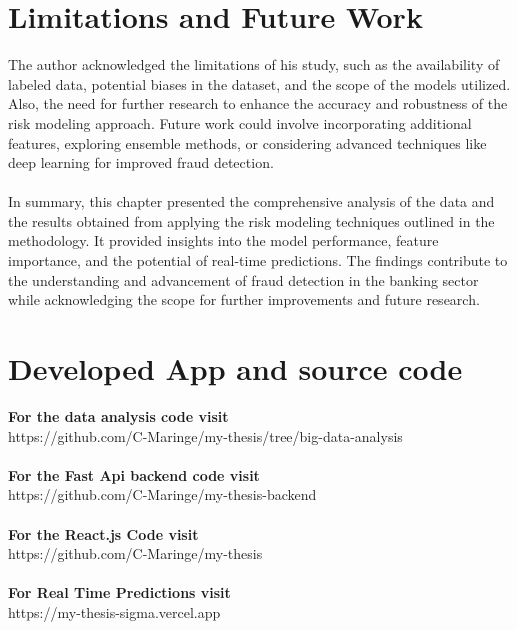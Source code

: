 \section{Limitations and Future Work}
The author acknowledged the limitations of his study, such as the availability of labeled data, potential biases in the 
dataset, and the scope of the models utilized. Also, the need for further research to enhance the accuracy 
and robustness of the risk modeling approach. Future work could involve incorporating additional features, 
exploring ensemble methods, or considering advanced techniques like deep learning for improved fraud detection.\\\\
In summary, this chapter presented the comprehensive analysis of the data and the results obtained from applying the 
risk modeling techniques outlined in the methodology. It provided insights into the model performance, feature 
importance, and the potential of real-time predictions. The findings contribute to the understanding and advancement 
of fraud detection in the banking sector while acknowledging the scope for further improvements and future research.

\section{Developed App and source code}

\textbf{For the data analysis code visit} \\
https://github.com/C-Maringe/my-thesis/tree/big-data-analysis \\\\
\textbf{For the Fast Api backend code visit} \\
https://github.com/C-Maringe/my-thesis-backend \\\\
\textbf{For the React.js Code visit} \\
https://github.com/C-Maringe/my-thesis \\\\
\textbf{For Real Time Predictions visit} \\
https://my-thesis-sigma.vercel.app \\\\